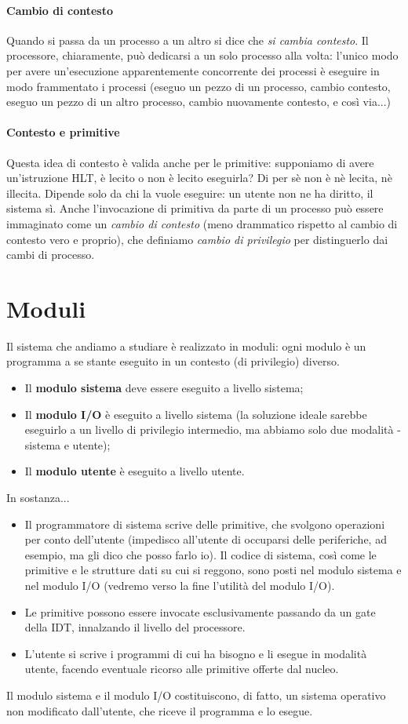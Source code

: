 \documentclass[11pt]{report}
\theoremstyle{definition}
\begin{document}
\paragraph{Cambio di contesto}
Quando si passa da un processo a un altro si dice che \emph{si cambia contesto}. Il processore, chiaramente, può dedicarsi a un solo processo alla volta: l'unico modo per avere un'esecuzione apparentemente concorrente dei processi è eseguire in modo frammentato i processi (eseguo un pezzo di un processo, cambio contesto, eseguo un pezzo di un altro processo, cambio nuovamente contesto, e così via...)
\paragraph{Contesto e primitive}
Questa idea di contesto è valida anche per le primitive: supponiamo di avere un'istruzione HLT, è lecito o non è lecito eseguirla? Di per sè non è nè lecita, nè illecita. Dipende solo da chi la vuole eseguire: un utente non ne ha diritto, il sistema sì. Anche l'invocazione di primitiva da parte di un processo può essere immaginato come un \emph{cambio di contesto} (meno drammatico rispetto al cambio di contesto vero e proprio), che definiamo \emph{cambio di privilegio} per distinguerlo dai cambi di processo.

\section{Moduli} Il sistema che andiamo a studiare è realizzato in moduli: ogni modulo è un programma a se stante eseguito in un contesto (di privilegio) diverso. 
\begin{itemize}
\item Il \textbf{modulo sistema} deve essere eseguito a livello sistema;
\item Il \textbf{modulo I/O} è eseguito a livello sistema (la soluzione ideale sarebbe eseguirlo a un livello di privilegio intermedio, ma abbiamo solo due modalità - sistema e utente);
\item Il \textbf{modulo utente} è eseguito a livello utente. 
\end{itemize}
In sostanza...
\begin{itemize}
	\item Il programmatore di sistema scrive delle primitive, che svolgono operazioni per conto dell'utente (impedisco all'utente di occuparsi delle periferiche, ad esempio, ma gli dico che posso farlo io). Il codice di sistema, così come le primitive e le strutture dati su cui si reggono, sono posti nel modulo sistema e nel modulo I/O (vedremo verso la fine l'utilità del modulo I/O). 
	\item Le primitive possono essere invocate esclusivamente passando da un gate della IDT, innalzando il livello del processore.  
	\item L'utente si scrive i programmi di cui ha bisogno e li esegue in modalità utente, facendo eventuale ricorso alle primitive offerte dal nucleo. 
\end{itemize} Il modulo sistema e il modulo I/O costituiscono, di fatto, un sistema operativo non modificato dall'utente, che riceve il programma e lo esegue.
\end{document}
